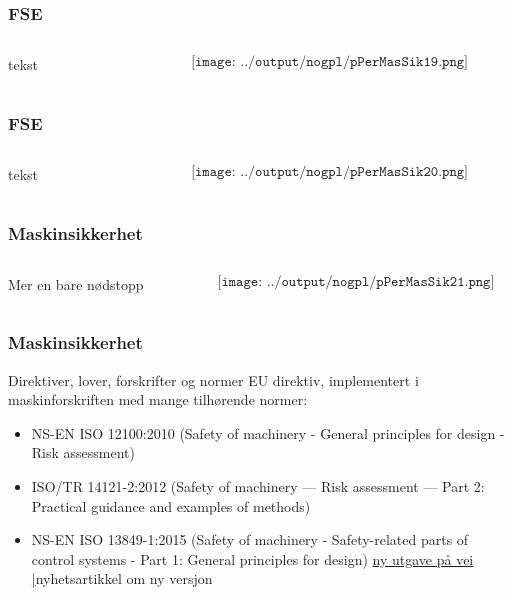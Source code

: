 \documentclass[aspectratio=169,xcolor=dvipsnames]{beamer}
\begin{document}
\begin{frame}
	\frametitle{FSE}
	\begin{columns}
		\begin{column}{0.5\textwidth}
tekst
			
		\end{column}

		\begin{column}{0.5\textwidth}
	$$\texttt{[image: ../output/nogpl/pPerMasSik19.png]}$$
		\end{column}
	\end{columns}
\end{frame}

\begin{frame}
	\frametitle{FSE}
	\begin{columns}
		\begin{column}{0.5\textwidth}
tekst
			
		\end{column}

		\begin{column}{0.5\textwidth}
	$$\texttt{[image: ../output/nogpl/pPerMasSik20.png]}$$
		\end{column}
	\end{columns}
\end{frame}

\begin{frame}
	\frametitle{Maskinsikkerhet}
	\begin{columns}
		\begin{column}{0.5\textwidth}
Mer en bare nødstopp
			
		\end{column}

		\begin{column}{0.5\textwidth}
	$$\texttt{[image: ../output/nogpl/pPerMasSik21.png]}$$
		\end{column}
	\end{columns}
\end{frame}
\begin{frame}
	\frametitle{Maskinsikkerhet}
\vskip 1cm
Direktiver, lover, forskrifter og normer
\vskip 1cm
EU direktiv, implementert i maskinforskriften med mange tilhørende normer:
\begin{itemize}
	\item NS-EN ISO 12100:2010 (Safety of machinery - General principles for design - Risk assessment)
	\item ISO/TR 14121-2:2012 (Safety of machinery — Risk assessment — Part 2: Practical guidance and examples of methods)
	\item NS-EN ISO 13849-1:2015 (Safety of machinery - Safety-related parts of control systems - Part 1: General principles for design) \href{https://www.iso.org/standard/73481.html}{ny utgave på vei} \href{https://www.gt-engineering.it/en/en-iso-standards/en-ISO-13849-1-performance-level-estimation/ISO-13849-1-new-edition-2023}|{nyhetsartikkel om ny versjon}

\end{itemize} 			
\end{frame}
\end{document}
